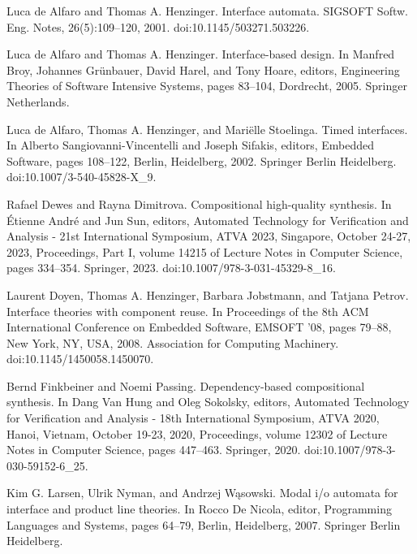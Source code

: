 \documentclass[10pt,a4paper]{article}
\begin{document}
\par\noindent  [14]  Luca de Alfaro and Thomas A. Henzinger.  Interface automata.  SIGSOFT Softw. Eng. Notes, 26(5):109–120, 2001.  doi:10.1145/503271.503226.  
 
\par\noindent  [15]  Luca de Alfaro and Thomas A. Henzinger.  Interface-based design.  In Manfred Broy, Johannes Grünbauer, David Harel, and Tony Hoare, editors, Engineering Theories of Software Intensive Systems, pages 83–104, Dordrecht, 2005. Springer Netherlands.  
 
\par\noindent  [16]  Luca de Alfaro, Thomas A. Henzinger, and Mariëlle Stoelinga.  Timed interfaces.  In Alberto Sangiovanni-Vincentelli and Joseph Sifakis, editors, Embedded Software, pages 108–122, Berlin, Heidelberg, 2002. Springer Berlin Heidelberg.  doi:10.1007/3-540-45828-X\_9.  
 
\par\noindent  [17]  Rafael Dewes and Rayna Dimitrova.  Compositional high-quality synthesis.  In Étienne André and Jun Sun, editors, Automated Technology for Verification and Analysis - 21st International Symposium, ATVA 2023, Singapore, October 24-27, 2023, Proceedings, Part I, volume 14215 of Lecture Notes in Computer Science, pages 334–354. Springer, 2023.  doi:10.1007/978-3-031-45329-8\_16.  
 
\par\noindent  [18]  Laurent Doyen, Thomas A. Henzinger, Barbara Jobstmann, and Tatjana Petrov.  Interface theories with component reuse.  In Proceedings of the 8th ACM International Conference on Embedded Software, EMSOFT ’08, pages 79–88, New York, NY, USA, 2008. Association for Computing Machinery.  doi:10.1145/1450058.1450070.  
 
\par\noindent  [19]  Bernd Finkbeiner and Noemi Passing.  Dependency-based compositional synthesis.  In Dang Van Hung and Oleg Sokolsky, editors, Automated Technology for Verification and Analysis - 18th International Symposium, ATVA 2020, Hanoi, Vietnam, October 19-23, 2020, Proceedings, volume 12302 of Lecture Notes in Computer Science, pages 447–463. Springer, 2020.  doi:10.1007/978-3-030-59152-6\_25.  
 
\par\noindent  [20]  Kim G. Larsen, Ulrik Nyman, and Andrzej Wąsowski.  Modal i/o automata for interface and product line theories.  In Rocco De Nicola, editor, Programming Languages and Systems, pages 64–79, Berlin, Heidelberg, 2007. Springer Berlin Heidelberg.  
 
\end{document}
